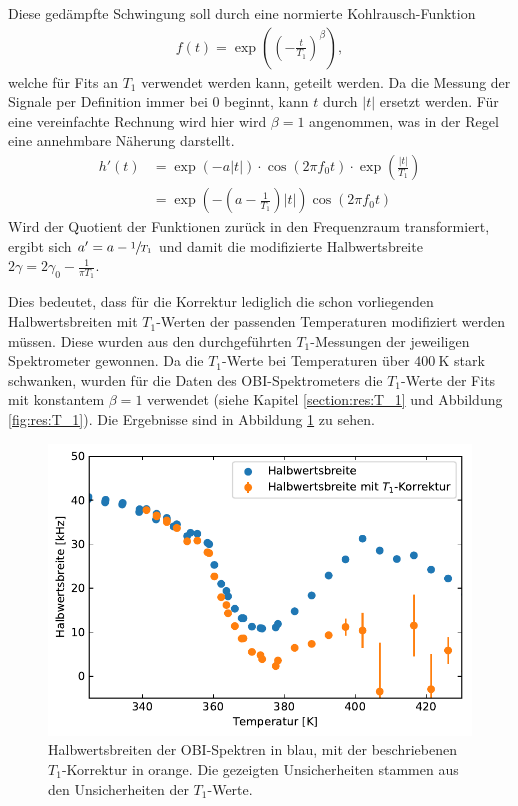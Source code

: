 Diese gedämpfte Schwingung soll durch eine normierte Kohlrausch-Funktion
\begin{align}
	f(t) = \exp{\left( {\left(-\frac{t}{T_1} \right)}^\beta \right) },
\end{align}
welche für Fits an $T_1$ verwendet werden kann, geteilt werden. Da die Messung der Signale per Definition immer bei 0 beginnt, kann $t$ durch $|t|$ ersetzt werden. Für eine vereinfachte Rechnung wird hier wird $\beta = 1$ angenommen, was in der Regel eine annehmbare Näherung darstellt.
\begin{align}
	h'(t) &= \exp{(-a \lvert t \rvert)} \cdot \cos{(2 \pi f_0 t)} \cdot \exp{\left(\frac{|t|}{T_1} \right)} \\
	&= \exp{\left(- \left(a - \frac{1}{T_1}\right) |t|\right)} \cos{(2 \pi f_0 t)}
\end{align}
Wird der Quotient der Funktionen zurück in den Frequenzraum transformiert, ergibt sich $a' = a - \sfrac{1}{T_1}$ und damit die modifizierte Halbwertsbreite $2\gamma = 2\gamma_0 - \frac{1}{\pi T_1}$.

Dies bedeutet, dass für die Korrektur lediglich die schon vorliegenden Halbwertsbreiten mit $T_1$-Werten der passenden Temperaturen modifiziert werden müssen. Diese wurden aus den durchgeführten $T_1$-Messungen der jeweiligen Spektrometer gewonnen. Da die $T_1$-Werte bei Temperaturen über $\SI{400}{\kelvin}$ stark schwanken, wurden für die Daten des OBI-Spektrometers die $T_1$-Werte der Fits mit konstantem $\beta = 1$ verwendet (siehe Kapitel \ref{section:res:T_1} und Abbildung \ref{fig:res:T_1}). Die Ergebnisse sind in Abbildung \ref{fig:res:spek_fwhm_t1} zu sehen.
\begin{figure}
	\begin{center}
		\includegraphics[width=.8\textwidth]{graphics/plot/fwhm_t1.pdf}
	\end{center}
	\caption{Halbwertsbreiten der OBI-Spektren in blau, mit der beschriebenen $T_1$-Korrektur in orange. Die gezeigten Unsicherheiten stammen aus den Unsicherheiten der $T_1$-Werte.} \label{fig:res:spek_fwhm_t1}
\end{figure}

